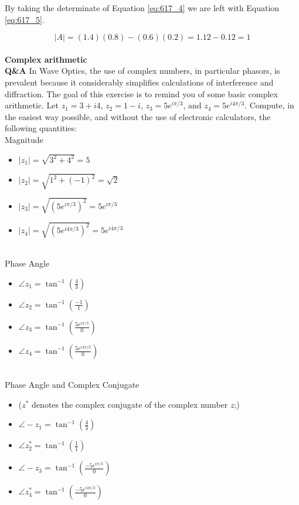 \documentclass[main.tex]{subfiles}
\begin{document}
By taking the determinate of Equation \ref{eq:617_4} we are left with Equation \ref{eq:617_5}.

\begin{equation}\label{eq:617_5}
|A|= (1.4)(0.8) - (0.6)(0.2) = 1.12 - 0.12 = 1
\end{equation}\\

\textbf{Complex arithmetic}\\
\textbf{Q\&A} In Wave Optics, the use of complex numbers, in particular phasors, is prevalent because it considerably simplifies calculations of interference and diffraction. The goal of this exercise is to remind you of some basic complex arithmetic. Let $z_1 = 3 + i4$, $z_2 = 1-i$, $z_3 = 5e^{i\pi /3}$, and $z_4=5e^{i4\pi/3}$. Compute, in the easiest way possible, and without the use of electronic calculators, the following quantities:\\

Magnitude
\begin{itemize}
  \item $|z_1| = \sqrt{3^2 + 4^2} = 5$
  \item $|z_2| = \sqrt{1^2 + (-1)^2} = \sqrt{2}$
  \item $|z_3| = \sqrt{(5e^{i\pi /3})^2} = 5e^{i\pi /3} $
  \item $|z_4| = \sqrt{(5e^{i4\pi /3})^2} = 5e^{i4\pi /3}$ 
\end{itemize}\\

Phase Angle
\begin{itemize}
  \item $\angle z_1 = \tan^{-1}(\frac{4}{3})  $
  \item $\angle z_2 = \tan^{-1}(\frac{-1}{1}) $
  \item $\angle z_3 = \tan^{-1}(\frac{5e^{i\pi /3}}{0}) $
  \item $\angle z_4 = \tan^{-1}(\frac{5e^{i4\pi/3}}{0}) $
 \end{itemize}\\

Phase Angle and Complex Conjugate
 \begin{itemize}
  \item ($z^*$ denotes the complex conjugate of the complex number $z$;)
  \item $\angle -z_1 = \tan^{-1}(\frac{4}{3})  $
  \item $\angle z_2^* = \tan^{-1}(\frac{1}{1}) $
  \item $\angle -z_3 = \tan^{-1}(\frac{-5e^{i\pi /3}}{0}) $
  \item $\angle z_4^* = \tan^{-1}(\frac{-5e^{i4\pi/3}}{0}) $ 
 \end{itemize}
 
\end{document}
